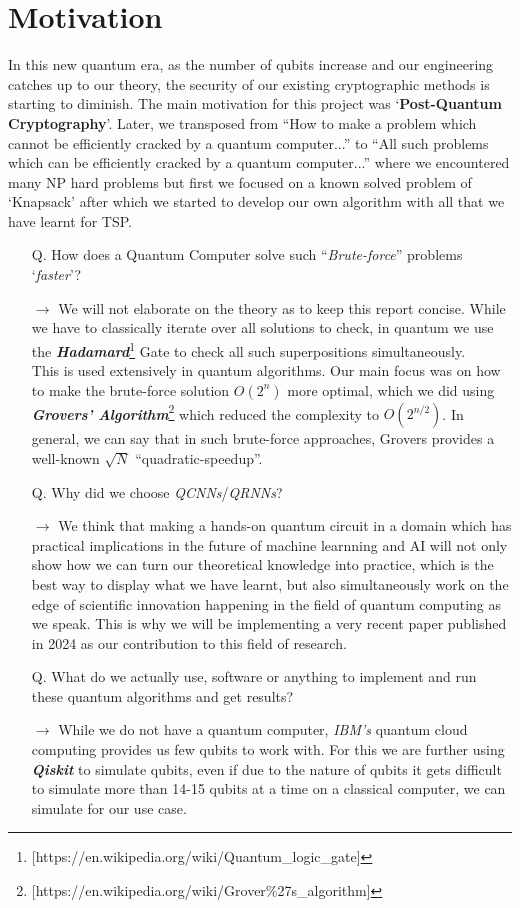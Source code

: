 \documentclass[a4paper]{article}
\begin{document}
\section*{Motivation}
In this new quantum era, as the number of qubits increase and our engineering catches up to our theory, the security of our existing cryptographic methods is starting to diminish. The main motivation for this project was `\textbf{Post-Quantum Cryptography}'. Later, we transposed from ``How to make a problem which cannot be efficiently cracked by a quantum computer...'' to ``All such problems which can be efficiently cracked by a quantum computer...'' where we encountered many NP hard problems but first we focused on a known solved problem of `Knapsack' after which we started to develop our own algorithm with all that we have learnt for TSP.
\begin{itemize}
\item[Q.] How does a Quantum Computer solve such ``\emph{Brute-force}'' problems `\emph{faster}'?
\item[\textbf{$\rightarrow$}] We will not elaborate on the theory as to keep this report concise. While we have to classically iterate over all solutions to check, in quantum we use the \textbf{\emph{Hadamard}}\footnote{[https://en.wikipedia.org/wiki/Quantum\_logic\_gate]} Gate to check all such superpositions simultaneously.\vspace{5pt}\\
This is used extensively in quantum algorithms. Our main focus was on how to make the brute-force solution $O(2^{n})$ more optimal, which we did using \emph{\textbf{Grovers' Algorithm}}\footnote{[https://en.wikipedia.org/wiki/Grover\%27s\_algorithm]} which reduced the complexity to $O(2^{n/2})$. In general, we can say that in such brute-force approaches, Grovers provides a well-known $\sqrt{N}$ ``quadratic-speedup''.

\item[Q.] Why did we choose \emph{QCNNs}/\emph{QRNNs}?
\item[\textbf{$\rightarrow$}] We think that making a hands-on quantum circuit in a domain which has practical implications in the future of machine learnning and AI will not only show how we can turn our theoretical knowledge into practice, which is the best way to display what we have learnt, but also simultaneously work on the edge of scientific innovation happening in the field of quantum computing as we speak. This is why we will be implementing a very recent paper published in 2024 as our contribution to this field of research.

\item[Q.] What do we actually use, software or anything to implement and run these quantum algorithms and get results?
\item[\textbf{$\rightarrow$}] While we do not have a quantum computer,  \emph{IBM's} quantum cloud computing provides us few qubits to work with. For this we are further using \textbf{\emph{Qiskit}} to simulate qubits, even if due to the nature of qubits it gets difficult to simulate more than 14-15 qubits at a time on a classical computer, we can simulate for our use case.
\end{itemize}
\end{document}
